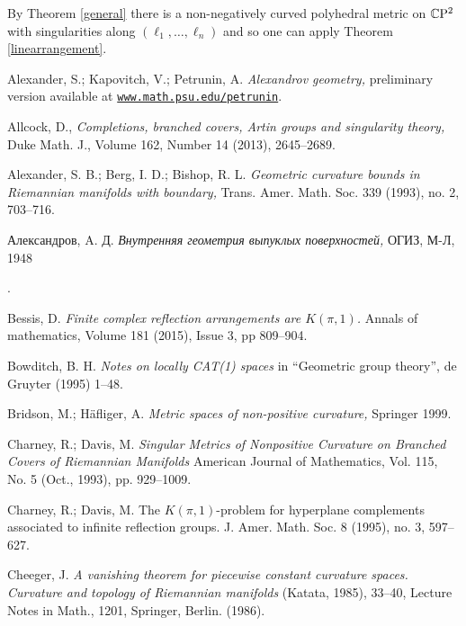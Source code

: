 \documentclass[oneside,a4paper]{article}
\begin{document}
By Theorem \ref{general} there is a non-negatively curved polyhedral metric on
$\mathbb{C}\mathrm{P}^2$ with singularities along $(\ell_1,\dots,\ell_n)$ and so one can apply Theorem \ref{linearrangement}.
\qeds


\begin{thebibliography}{52}

  Alexander, S.;
Kapovitch, V.;
Petrunin, A.
\textit{Alexandrov geometry,}
preliminary version available at \href{http://www.math.psu.edu/petrunin/}{\tt www.math.psu.edu/petrunin}.

Allcock, D.,
\textit{Completions, branched covers, Artin groups and singularity theory,}
Duke Math. J., Volume 162, Number 14 (2013), 2645--2689. 

Alexander, S. B.; 
Berg, I. D.; 
Bishop, R. L. 
\textit{Geometric curvature bounds in Riemannian manifolds with boundary,} 
Trans. Amer. Math. Soc. 339 (1993), no. 2, 703--716.


\begin{otherlanguage}{russian}
Александров, A. Д.
\textit{Внутренняя геометрия выпуклых поверхностей,} ОГИЗ, М-Л, 1948
    \end{otherlanguage}.

Bessis, D.
\textit{Finite complex reflection arrangements are $K(\pi,1)$.}
Annals of mathematics,  Volume 181 (2015), Issue 3, pp 809--904.

Bowditch, B. H.
\textit{Notes on locally CAT(1) spaces}
in ``Geometric group theory'',  de Gruyter (1995) 1--48.

Bridson, M.;
H\"afliger, A.
\textit{Metric spaces of non-positive curvature,} Springer 1999.

Charney, R.;
Davis, M.
\textit{Singular Metrics of Nonpositive Curvature on Branched Covers of Riemannian Manifolds}
American Journal of Mathematics, Vol. 115, No. 5 (Oct., 1993), pp. 929--1009.

Charney, R.; 
Davis, M. 
The $K(\pi,1)$-problem for hyperplane complements associated to infinite reflection groups. J. Amer. Math. Soc. 8 (1995), no. 3, 597--627. 

Cheeger, J.
\textit{A vanishing theorem for piecewise constant curvature spaces. Curvature and topology of Riemannian manifolds}
(Katata, 1985), 33--40, 
Lecture Notes in Math.,
1201, Springer, Berlin. (1986).


\end{thebibliography}
\end{document}
